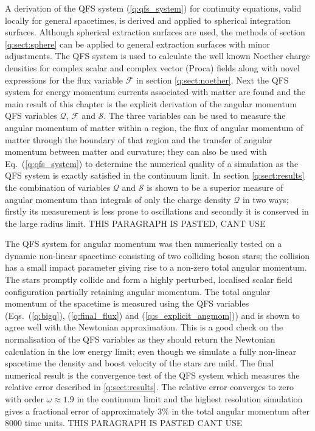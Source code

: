 A derivation of the QFS system (\ref{q:qfs_system}) for continuity equations,
valid locally for general spacetimes, is derived and applied to spherical integration
surfaces. Although spherical extraction surfaces are used, the methods of section
\ref{q:sect:sphere} can be applied to general extraction surfaces with minor adjustments.
The QFS system is used to calculate the well known Noether charge densities for
complex scalar and complex vector (Proca) fields along with novel expressions for
the flux variable $\mathcal{F}$ in section \ref{q:sect:noether}. Next the QFS system
for energy momentum currents associated with matter are found and the main result
of this chapter is the explicit derivation of the angular momentum QFS variables
$\mathcal{Q}$,  $\mathcal{F}$ and $\mathcal{S}$. The three variables can be used
to measure the angular momentum of matter within a region, the flux of angular
momentum of matter through the boundary of that region and the transfer of angular
momentum between matter and curvature; they can also be used with Eq.~(\ref{q:qfs_system})
to determine the numerical quality of a simulation as the QFS system is exactly
satisfied in the continuum limit. In section \ref{q:sect:results} the combination
of variables $\mathcal{Q}$ and $\mathcal{S}$ is shown to be a superior measure of
angular momentum than integrals of only the charge density $\mathcal{Q}$ in two
ways; firstly its measurement is less prone to oscillations and secondly it is
conserved in the large radius limit. THIS PARAGRAPH IS PASTED, CANT USE

The QFS system for angular momentum was then numerically tested on a dynamic non-linear
spacetime consisting of two colliding boson stars; the collision has a small impact
parameter giving rise to a non-zero total angular momentum. The stars promptly
collide and form a highly perturbed, localised scalar field configuration partially
retaining angular momentum. The total angular momentum of the spacetime is
measured using the QFS variables (Eqs.~(\ref{q:bigq}), (\ref{q:final_flux}) and
(\ref{q:s_explicit_angmom})) and is shown to agree well with the Newtonian
approximation. This is a good check on the normalisation of the QFS variables as
they should return the Newtonian calculation in the low energy limit; even though
we simulate a fully non-linear spacetime the density and boost velocity of the
stars are mild. The final numerical result is the convergence test of the QFS system
which measures the relative error described in \ref{q:sect:results}. The relative
error converges to zero with order $\omega\approx 1.9$ in the continuum limit
and the highest resolution simulation gives a fractional error of approximately
$3 \%$ in the total angular momentum after $8000$ time units. THIS PARAGRAPH IS PASTED CANT USE

